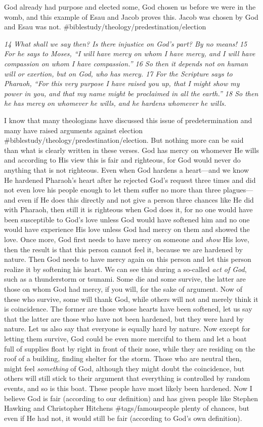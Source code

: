 God already had purpose and elected some, God chosen us before we were
in the womb, and this example of Esau and Jacob proves this. Jacob was
chosen by God and Esau was not.
\#biblestudy/theology/predestination/election

\emph{14 What shall we say then? Is there injustice on God's part? By no
means! 15 For he says to Moses, ``I will have mercy on whom I have
mercy, and I will have compassion on whom I have compassion.'' 16 So
then it depends not on human will or exertion, but on God, who has
mercy. 17 For the Scripture says to Pharaoh, ``For this very purpose I
have raised you up, that I might show my power in you, and that my name
might be proclaimed in all the earth.'' 18 So then he has mercy on
whomever he wills, and he hardens whomever he wills.}

I know that many theologians have discussed this issue of
predetermination and many have raised arguments against election
\#biblestudy/theology/predestination/election. But nothing more can be
said than what is clearly written in these verses. God has mercy on
whomever He wills and according to His view this is fair and righteous,
for God would never do anything that is not righteous. Even when God
hardens a heart---and we know He hardened Pharaoh's heart after he
rejected God's request three times and did not even love his people
enough to let them suffer no more than three plagues---and even if He
does this directly and not give a person three chances like He did with
Pharaoh, then still it is righteous when God does it, for no one would
have been susceptible to God's love unless God would have softened him
and no one would have experience His love unless God had mercy on them
and showed the love. Once more, God first needs to have mercy on someone
and \emph{show} His love, then the result is that this person cannot
feel it, because we are hardened by nature. Then God needs to have mercy
again on this person and let this person realize it by softening his
heart. We can see this during a so-called \emph{act of God}, such as a
thunderstorm or tsunami. Some die and some survive, the latter are those
on whom God had mercy, if you will, for the sake of argument. Now of
these who survive, some will thank God, while others will not and merely
think it is coincidence. The former are those whose hearts have been
softened, let us say that the latter are those who have not been
hardened, but they were hard by nature. Let us also say that everyone is
equally hard by nature. Now except for letting them survive, God could
be even more merciful to them and let a boat full of supplies float by
right in front of their nose, while they are residing on the roof of a
building, finding shelter for the storm. Those who are neutral then,
might feel \emph{something} of God, although they might doubt the
coincidence, but others will still stick to their argument that
everything is controlled by random events, and so is this boat. These
people have most likely been hardened. Now I believe God is fair
(according to our definition) and has given people like Stephen Hawking
and Christopher Hitchens \#tags/famouspeople plenty of chances, but even
if He had not, it would still be fair (according to God's own
definition).

